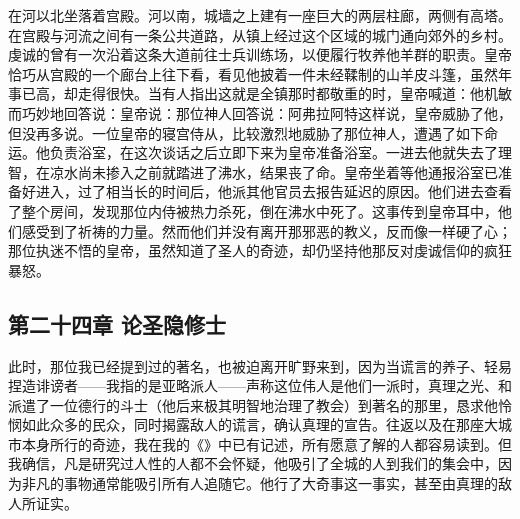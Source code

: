 在河以北坐落着宫殿。河以南，城墙之上建有一座巨大的两层柱廊，两侧有高塔。在宫殿与河流之间有一条公共道路，从镇上经过这个区域的城门通向郊外的乡村。虔诚的曾有一次沿着这条大道前往士兵训练场，以便履行牧养他羊群的职责。皇帝恰巧从宫殿的一个廊台上往下看，看见他披着一件未经鞣制的山羊皮斗篷，虽然年事已高，却走得很快。当有人指出这就是全镇那时都敬重的时，皇帝喊道：他机敏而巧妙地回答说：皇帝说：那位神人回答说：阿弗拉阿特这样说，皇帝威胁了他，但没再多说。一位皇帝的寝宫侍从，比较激烈地威胁了那位神人，遭遇了如下命运。他负责浴室，在这次谈话之后立即下来为皇帝准备浴室。一进去他就失去了理智，在凉水尚未掺入之前就踏进了沸水，结果丧了命。皇帝坐着等他通报浴室已准备好进入，过了相当长的时间后，他派其他官员去报告延迟的原因。他们进去查看了整个房间，发现那位内侍被热力杀死，倒在沸水中死了。这事传到皇帝耳中，他们感受到了祈祷的力量。然而他们并没有离开那邪恶的教义，反而像一样硬了心；那位执迷不悟的皇帝，虽然知道了圣人的奇迹，却仍坚持他那反对虔诚信仰的疯狂暴怒。\par


\subsection{第二十四章 论圣隐修士}

此时，那位我已经提到过的著名，也被迫离开旷野来到，因为当谎言的养子、轻易捏造诽谤者——我指的是亚略派人——声称这位伟人是他们一派时，真理之光、和派遣了一位德行的斗士（他后来极其明智地治理了教会）到著名的那里，恳求他怜悯如此众多的民众，同时揭露敌人的谎言，确认真理的宣告。往返以及在那座大城市本身所行的奇迹，我在我的《》中已有记述，所有愿意了解的人都容易读到。但我确信，凡是研究过人性的人都不会怀疑，他吸引了全城的人到我们的集会中，因为非凡的事物通常能吸引所有人追随它。他行了大奇事这一事实，甚至由真理的敌人所证实。\par

